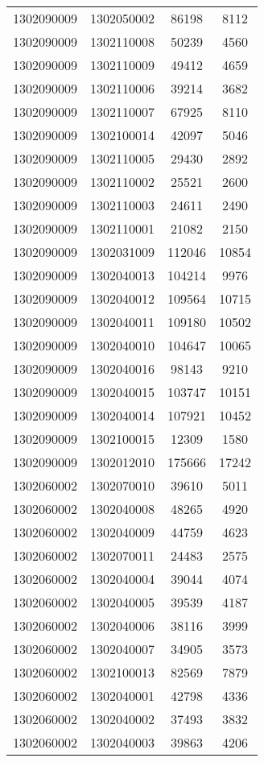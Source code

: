 \begin{longtable}[h]{llcc}
		1302090009 & 1302050002 & 86198 & 8112\\
		1302090009 & 1302110008 & 50239 & 4560\\
		1302090009 & 1302110009 & 49412 & 4659\\
		1302090009 & 1302110006 & 39214 & 3682\\
		1302090009 & 1302110007 & 67925 & 8110\\
		1302090009 & 1302100014 & 42097 & 5046\\
		1302090009 & 1302110005 & 29430 & 2892\\
		1302090009 & 1302110002 & 25521 & 2600\\
		1302090009 & 1302110003 & 24611 & 2490\\
		1302090009 & 1302110001 & 21082 & 2150\\
		1302090009 & 1302031009 & 112046 & 10854\\
		1302090009 & 1302040013 & 104214 & 9976\\
		1302090009 & 1302040012 & 109564 & 10715\\
		1302090009 & 1302040011 & 109180 & 10502\\
		1302090009 & 1302040010 & 104647 & 10065\\
		1302090009 & 1302040016 & 98143 & 9210\\
		1302090009 & 1302040015 & 103747 & 10151\\
		1302090009 & 1302040014 & 107921 & 10452\\
		1302090009 & 1302100015 & 12309 & 1580\\
		1302090009 & 1302012010 & 175666 & 17242\\
		1302060002 & 1302070010 & 39610 & 5011\\
		1302060002 & 1302040008 & 48265 & 4920\\
		1302060002 & 1302040009 & 44759 & 4623\\
		1302060002 & 1302070011 & 24483 & 2575\\
		1302060002 & 1302040004 & 39044 & 4074\\
		1302060002 & 1302040005 & 39539 & 4187\\
		1302060002 & 1302040006 & 38116 & 3999\\
		1302060002 & 1302040007 & 34905 & 3573\\
		1302060002 & 1302100013 & 82569 & 7879\\
		1302060002 & 1302040001 & 42798 & 4336\\
		1302060002 & 1302040002 & 37493 & 3832\\
		1302060002 & 1302040003 & 39863 & 4206\\

\end{longtable}
